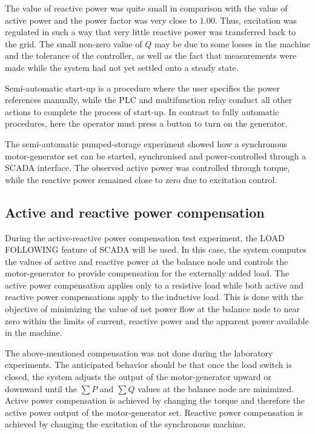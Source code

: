 \documentclass{article}
\begin{document}
The value of reactive power was quite small in comparison with the value of active
power and the power factor was very close to 1.00. Thus, excitation was regulated in such
a way that very little reactive power was transferred back to the grid. The small non-zero
value of $Q$ may be due to some losses in the machine and the tolerance of the controller,
as well as the fact that measurements were made while the system had not yet settled
onto a steady state.

Semi-automatic start-up is a procedure where the user specifies the power references
manually, while the PLC and multifunction relay conduct all other actions to complete
the process of start-up. In contrast to fully automatic procedures, here the operator
must press a button to turn on the generator.

The semi-automatic pumped-storage experiment showed how a synchronous motor-generator set
can be started, synchronised and power-controlled through a SCADA interface.
The observed active power was controlled through torque, while the reactive power
remained close to zero due to excitation control.

\subsection{Active and reactive power compensation}
During the active-reactive power compensation test experiment, the LOAD FOLLOWING feature
of SCADA will be used. In this case, the system computes the values of active and
reactive power at the balance node and controls the motor-generator to provide compensation
for the externally added load. The active power compensation applies only to a resistive
load while both active and reactive power compensations apply to the inductive load.
This is done with the objective of minimizing the value of net power flow at the balance
node to near zero within the limits of current, reactive power and the apparent power
available in the machine.

The above-mentioned compensation was not done during the laboratory experiments.
The anticipated behavior should be that once the load switch is closed, the system adjusts
the output of the motor-generator upward or downward until the $\sum P$ and $\sum Q$
values at the balance node are minimized. Active power compensation is achieved by
changing the torque and therefore the active power output of the motor-generator set.
Reactive power compensation is achieved by changing the excitation of the synchronous
machine.
\end{document}
